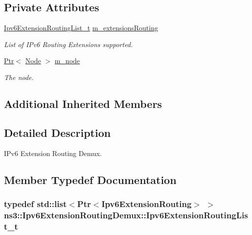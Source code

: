 \subsection*{Private Attributes}
\begin{DoxyCompactItemize}
\item 
\hyperlink{classns3_1_1Ipv6ExtensionRoutingDemux_a70982c84ce76caba8a9eb06e088bda5c}{Ipv6\+Extension\+Routing\+List\+\_\+t} \hyperlink{classns3_1_1Ipv6ExtensionRoutingDemux_ae1f6bbc46cefa4791a4be3f38d4c8885}{m\+\_\+extensions\+Routing}
\begin{DoxyCompactList}\small\item\em List of I\+Pv6 Routing Extensions supported. \end{DoxyCompactList}\item 
\hyperlink{classns3_1_1Ptr}{Ptr}$<$ \hyperlink{classns3_1_1Node}{Node} $>$ \hyperlink{classns3_1_1Ipv6ExtensionRoutingDemux_ad38f596db08784e26f953912bcaae9a7}{m\+\_\+node}
\begin{DoxyCompactList}\small\item\em The node. \end{DoxyCompactList}\end{DoxyCompactItemize}
\subsection*{Additional Inherited Members}


\subsection{Detailed Description}
I\+Pv6 Extension Routing Demux. 

\subsection{Member Typedef Documentation}
\subsubsection[{\texorpdfstring{Ipv6\+Extension\+Routing\+List\+\_\+t}{Ipv6ExtensionRoutingList_t}}]{\setlength{\rightskip}{0pt plus 5cm}typedef {\bf std\+::list}$<${\bf Ptr}$<${\bf Ipv6\+Extension\+Routing}$>$ $>$ {\bf ns3\+::\+Ipv6\+Extension\+Routing\+Demux\+::\+Ipv6\+Extension\+Routing\+List\+\_\+t}\hspace{0.3cm}{\ttfamily [private]}}\hypertarget{classns3_1_1Ipv6ExtensionRoutingDemux_a70982c84ce76caba8a9eb06e088bda5c}{}\label{classns3_1_1Ipv6ExtensionRoutingDemux_a70982c84ce76caba8a9eb06e088bda5c}


